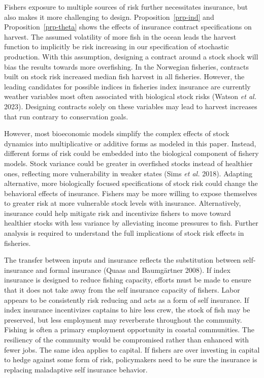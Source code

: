 \documentclass[
  letterpaper,
  DIV=11,
  numbers=noendperiod]{scrartcl}
\theoremstyle{plain}
\theoremstyle{plain}
\theoremstyle{remark}
\begin{document}
Fishers exposure to multiple sources of risk further necessitates
insurance, but also makes it more challenging to design.
Proposition~\ref{prp-ind} and Proposition~\ref{prp-theta} shows the
effects of insurance contract specifications on harvest. The assumed
volatility of more fish in the ocean leads the harvest function to
implicitly be risk increasing in our specification of stochastic
production. With this assumption, designing a contract around a stock
shock will bias the results towards more overfishing. In the Norwegian
fisheries, contracts built on stock risk increased median fish harvest
in all fisheries. However, the leading candidates for possible indices
in fisheries index insurance are currently weather variables most often
associated with biological stock risks (Watson \emph{et al.} 2023).
Designing contracts solely on these variables may lead to harvest
increases that run contrary to conservation goals.

However, most bioeconomic models simplify the complex effects of stock
dynamics into multiplicative or additive forms as modeled in this paper.
Instead, different forms of risk could be embedded into the biological
component of fishery models. Stock variance could be greater in
overfished stocks instead of healthier ones, reflecting more
vulnerability in weaker states (Sims \emph{et al.} 2018). Adapting
alternative, more biologically focused specifications of stock risk
could change the behavioral effects of insurance. Fishers may be more
willing to expose themselves to greater risk at more vulnerable stock
levels with insurance. Alternatively, insurance could help mitigate risk
and incentivize fishers to move toward healthier stocks with less
variance by alleviating income pressures to fish. Further analysis is
required to understand the full implications of stock risk effects in
fisheries.

The transfer between inputs and insurance reflects the substitution
between self-insurance and formal insurance (Quaas and Baumgärtner
2008). If index insurance is designed to reduce fishing capacity,
efforts must be made to ensure that it does not take away from the self
insurance capacity of fishers. Labor appears to be consistently risk
reducing and acts as a form of self insurance. If index insurance
incentivizes captains to hire less crew, the stock of fish may be
preserved, but less employment may reverberate throughout the community.
Fishing is often a primary employment opportunity in coastal
communities. The resiliency of the community would be compromised rather
than enhanced with fewer jobs. The same idea applies to capital. If
fishers are over investing in capital to hedge against some form of
risk, policymakers need to be sure the insurance is replacing
maladaptive self insurance behavior.
\end{document}
